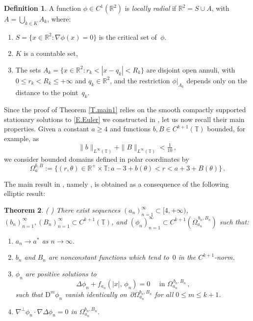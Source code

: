 \documentclass[11pt,oneside]{amsart}
\newtheorem{theorem}{Theorem}%
\theoremstyle{definition}
\newtheorem{definition}[theorem]{Definition}
\newcommand{\te}{\theta}
\newcommand{\Om}{\Omega}
\def\RR{\mathbb{R}}
\def\TT{\mathbb{T}}
\renewcommand\leq\leqslant
\renewcommand\geq\geqslant
\numberwithin{equation}{section}
\begin{document}
\begin{definition}\label{D.locradial} 
A function $\phi\in C^1(\RR^2)$ is {\em locally radial} if $\RR^2= S \cup A$, with $A= \bigcup_{k\in K}A_k$,
	where:
	\begin{enumerate}
		\item $ S=\{x\in\RR^2:\nabla \phi(x)=0\}$ is the critical set of~$\phi$.
		\item $K$ is a countable set,
		\item The sets $A_k=\{x\in\RR^2: r_k<|x-q_k|<R_k\}$ are disjoint open annuli, with $0 \leq r_k < R_k \leq +\infty$ and $q_k\in\RR^2$, and the restriction $\phi|_{A_k}$  depends only on the distance to the point~$q_k$.
	\end{enumerate}
\end{definition}



Since the proof of Theorem \ref{T.main1} relies on the smooth compactly supported stationary solutions to \eqref{E.Euler} we constructed in \cite{EFR}, let us now recall their main properties. Given a constant $a \geq {4}$ and functions $b,B\in C^{k+1}(\TT)$ bounded, for example, as
\[
\|b\|_{L^\infty(\TT)}+\|B\|_{L^\infty(\TT)}<\tfrac{1}{ 10}\,,
\]
we consider bounded domains defined in polar coordinates by
\begin{equation}\label{E.defOm}
\Om_a^{b,B}:=\{(r,\te)\in\RR^+\times\TT: a-3+b(\te)< r< a+3+B(\te)\}\,.
\end{equation}

\noindent The main result in \cite{EFR}, namely \cite[Theorem 1.1]{EFR}, is obtained as a consequence of the following elliptic result:

\begin{theorem}{\rm \hspace{-0.08cm} (\hspace{-0.1cm} \cite[Theorem 2.2]{EFR})} \label{T.EllipticStationary} There exist sequences $(a_n)_{n=1}^\infty \subset [4,+\infty)$, $(b_n)_{n=1}^\infty, (B_n)_{n=1}^\infty \subset C^{k+1}(\TT)$, and $(\phi_n)_{n=1}^\infty \subset C^{k+1}(\overline{\Omega}_{a_n}^{\,b_n,B_n})$ such that:
\begin{enumerate}
	\item $a_n\to a^*$ as $n\to\infty$. \smallbreak
	\item $b_n$ and $B_n$ are nonconstant functions which tend to~$0$ in the $C^{k+1}$-norm. \smallbreak
	\item $\phi_n$ are positive solutions to	
\begin{equation}\label{Ecuacion}
	\Delta \phi_n + f_{a_n}(|x|,\, \phi_n)  = 0\quad \text{ in }\Om_{a_n}^{\,b_n,B_n} \,,
\end{equation}
such that $\mathrm{D}^m\phi_n$ vanish identically on~$\partial \Omega_{a_n}^{b_n,B_n}$ for all $0\leq m\leq k+1$. \smallbreak

\item $\nabla^{\perp} \phi_n \cdot \nabla \Delta\phi_ n = 0$ in $\Omega_{a_n}^{b_n,B_n}$.  

\end{enumerate} 
\end{theorem}
\end{document}
